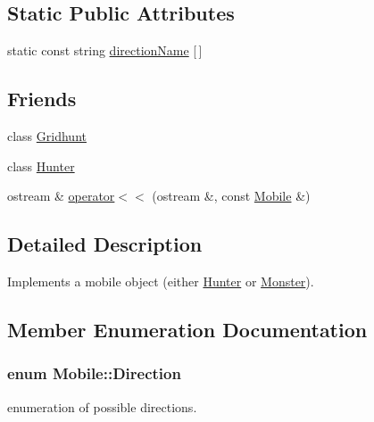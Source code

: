 \subsection*{Static Public Attributes}
\begin{DoxyCompactItemize}
\item 
static const string \hyperlink{classMobile_a06a7a3a56f97eb465a7ce1d546d54122}{directionName} \mbox{[}$\,$\mbox{]}
\end{DoxyCompactItemize}
\subsection*{Friends}
\begin{DoxyCompactItemize}
\item 
\hypertarget{classMobile_a97ca92e8335582acc13551199304d18c}{
class \hyperlink{classMobile_a97ca92e8335582acc13551199304d18c}{Gridhunt}}
\label{classMobile_a97ca92e8335582acc13551199304d18c}

\item 
\hypertarget{classMobile_a1d9d0b442936d7f157ef635128945570}{
class \hyperlink{classMobile_a1d9d0b442936d7f157ef635128945570}{Hunter}}
\label{classMobile_a1d9d0b442936d7f157ef635128945570}

\item 
ostream \& \hyperlink{classMobile_a201681f52e3b414a136bf49b69605647}{operator$<$$<$} (ostream \&, const \hyperlink{classMobile}{Mobile} \&)
\end{DoxyCompactItemize}


\subsection{Detailed Description}
Implements a mobile object (either \hyperlink{classHunter}{Hunter} or \hyperlink{classMonster}{Monster}). 

\subsection{Member Enumeration Documentation}
\hypertarget{classMobile_ad29e7ee47d99efad404c31ca4396cd5b}{
\subsubsection[{Direction}]{\setlength{\rightskip}{0pt plus 5cm}enum {\bf Mobile::Direction}}}
\label{classMobile_ad29e7ee47d99efad404c31ca4396cd5b}
enumeration of possible directions. 

